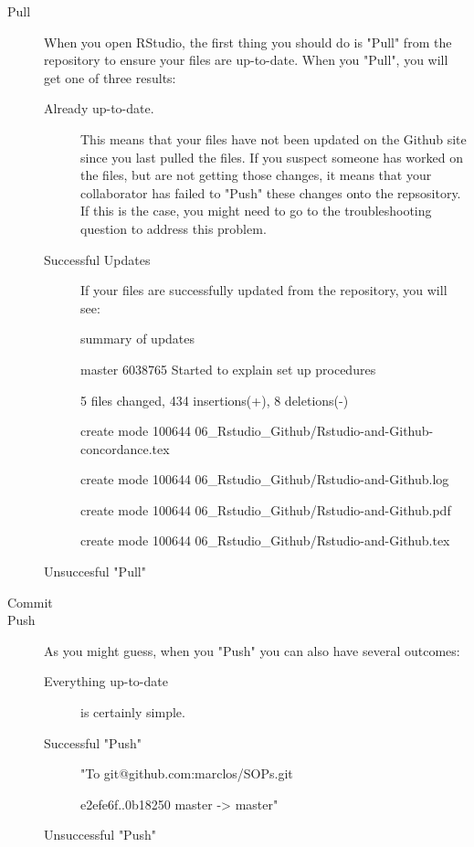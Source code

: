 \documentclass[12pt]{../SOP3_beta}
\begin{document}
\begin{description}
  \item[Pull] When you open RStudio, the first thing you should do is "Pull" from the repository to ensure your files are up-to-date. When you "Pull", you will get one of three results:
  
  \begin{description}
  \item[Already up-to-date.] This means that your files have not been updated on the Github site since you last pulled the files. If you suspect someone has worked on the files, but are not getting those changes, it means that your collaborator has failed to "Push" these changes onto the repsository. If this is the case, you might need to go to the troubleshooting question to address this problem.
  \item[Successful Updates] If your files are successfully updated from the repository, you will see:
  
summary of updates

master 6038765 Started to explain set up procedures
 
 5 files changed, 434 insertions(+), 8 deletions(-)
 
 create mode 100644 06\_Rstudio\_Github/Rstudio-and-Github-concordance.tex
 
 create mode 100644 06\_Rstudio\_Github/Rstudio-and-Github.log
 
 create mode 100644 06\_Rstudio\_Github/Rstudio-and-Github.pdf
 
 create mode 100644 06\_Rstudio\_Github/Rstudio-and-Github.tex
 
 \item[Unsuccesful "Pull"]
 
 
\end{description}

  \item[Commit]
  \item[Push] As you might guess, when you "Push" you can also have several outcomes:
\begin{description}
  \item[Everything up-to-date] is certainly simple.   \item[Successful "Push"]
  
    "To git@github.com:marclos/SOPs.git
  
   e2efe6f..0b18250  master -> master"
   \item[Unsuccessful "Push"]
\end{description}
  

\end{description}
\end{document}

